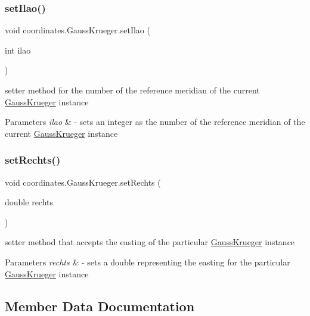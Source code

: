 \subsubsection{\texorpdfstring{set\+Ilao()}{setIlao()}}
{\footnotesize\ttfamily void coordinates.\+Gauss\+Krueger.\+set\+Ilao (\begin{DoxyParamCaption}\item[{int}]{ilao }\end{DoxyParamCaption})}



setter method for the number of the reference meridian of the current \hyperlink{classcoordinates_1_1_gauss_krueger}{Gauss\+Krueger} instance 


\begin{DoxyParams}{Parameters}
{\em ilao} & -\/ sets an integer as the number of the reference meridian of the current \hyperlink{classcoordinates_1_1_gauss_krueger}{Gauss\+Krueger} instance \\
\hline
\end{DoxyParams}
\mbox{\label{classcoordinates_1_1_gauss_krueger_aae6034f16ac245dac1c1d84722048894}} 
\subsubsection{\texorpdfstring{set\+Rechts()}{setRechts()}}
{\footnotesize\ttfamily void coordinates.\+Gauss\+Krueger.\+set\+Rechts (\begin{DoxyParamCaption}\item[{double}]{rechts }\end{DoxyParamCaption})}



setter method that accepts the easting of the particular \hyperlink{classcoordinates_1_1_gauss_krueger}{Gauss\+Krueger} instance 


\begin{DoxyParams}{Parameters}
{\em rechts} & -\/ sets a double representing the easting for the particular \hyperlink{classcoordinates_1_1_gauss_krueger}{Gauss\+Krueger} instance \\
\hline
\end{DoxyParams}


\subsection{Member Data Documentation}
\mbox{\label{classcoordinates_1_1_gauss_krueger_a8118e7f54b47ed00d9ba473f381392c0}} 

